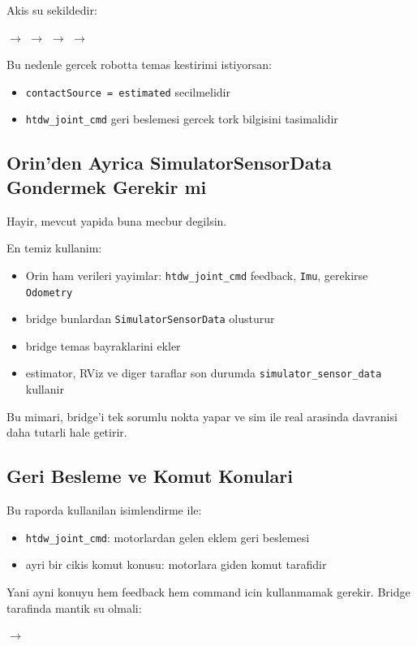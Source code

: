 \documentclass[11pt]{article}
\begin{document}
Akis su sekildedir:
\begin{center}
$\rightarrow$
$\rightarrow$
$\rightarrow$
$\rightarrow$
\end{center}

Bu nedenle gercek robotta temas kestirimi istiyorsan:
\begin{itemize}
  \item \texttt{contactSource = estimated} secilmelidir
  \item \texttt{htdw\_joint\_cmd} geri beslemesi gercek tork bilgisini tasimalidir
\end{itemize}

\subsection*{Orin'den Ayrica SimulatorSensorData Gondermek Gerekir mi}
Hayir, mevcut yapida buna mecbur degilsin.

En temiz kullanim:
\begin{itemize}
  \item Orin ham verileri yayimlar: \texttt{htdw\_joint\_cmd} feedback, \texttt{Imu}, gerekirse \texttt{Odometry}
  \item bridge bunlardan \texttt{SimulatorSensorData} olusturur
  \item bridge temas bayraklarini ekler
  \item estimator, RViz ve diger taraflar son durumda \texttt{simulator\_sensor\_data} kullanir
\end{itemize}

Bu mimari, bridge'i tek sorumlu nokta yapar ve sim ile real arasinda davranisi daha tutarli hale getirir.

\subsection*{Geri Besleme ve Komut Konulari}
Bu raporda kullanilan isimlendirme ile:
\begin{itemize}
  \item \texttt{htdw\_joint\_cmd}: motorlardan gelen eklem geri beslemesi
  \item ayri bir cikis komut konusu: motorlara giden komut tarafidir
\end{itemize}

Yani ayni konuyu hem feedback hem command icin kullanmamak gerekir. Bridge tarafinda mantik su olmali:
\begin{center}
$\rightarrow$
\end{center}
\end{document}
